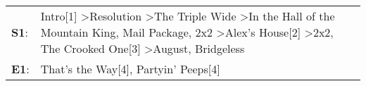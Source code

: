 \begin{supertabular}{p{0.03\textwidth}p{0.92\textwidth}}
 \textbf{S1}:  &  Intro[1]\textsuperscript{} \textgreater \enspace Resolution\textsuperscript{} \textgreater \enspace The Triple Wide\textsuperscript{} \textgreater \enspace In the Hall of the Mountain King\textsuperscript{}, \enspace Mail Package\textsuperscript{}, \enspace 2x2\textsuperscript{} \textgreater \enspace Alex's House[2]\textsuperscript{} \textgreater \enspace 2x2\textsuperscript{}, \enspace The Crooked One[3]\textsuperscript{} \textgreater \enspace August\textsuperscript{}, \enspace Bridgeless\textsuperscript{}  \enspace  \\
 \textbf{E1}:  &                                                                                                                                                                                                                                                                                                                                                                                                                                                 That's the Way[4]\textsuperscript{}, \enspace Partyin' Peeps[4]\textsuperscript{}  \enspace  \\
\end{supertabular}
